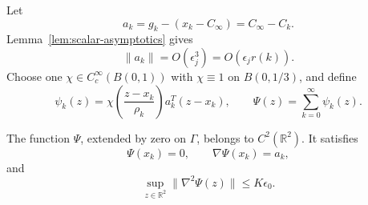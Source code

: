 \documentclass[smallextended,envcountsame]{svjour3}
\newcommand{\R}{\mathbb R}
\begin{document}
Let
\begin{equation}\label{eq:correction-vector}
a_k=g_k-(x_k-C_\infty)=C_\infty-C_k.
\end{equation}
Lemma~\ref{lem:scalar-asymptotics} gives
\begin{equation}\label{eq:ak-bound}
\|a_k\|=O(\epsilon_j^3)=O(\epsilon_jr(k)).
\end{equation}
Choose one $\chi\in C_c^\infty(B(0,1))$ with $\chi\equiv1$ on
$B(0,1/3)$, and define
\begin{equation}\label{eq:bumps}
\psi_k(z)=
\chi\!\left(\frac{z-x_k}{\rho_k}\right)a_k^T(z-x_k),
\qquad
\Psi(z)=\sum_{k=0}^\infty\psi_k(z).
\end{equation}

\begin{lemma}\label{lem:bump-extension}
The function $\Psi$, extended by zero on $\Gamma$, belongs to
$C^2(\R^2)$.  It satisfies
\begin{equation}\label{eq:bump-jets}
\Psi(x_k)=0,\qquad \nabla\Psi(x_k)=a_k,
\end{equation}
and
\begin{equation}\label{eq:bump-hessian}
\sup_{z\in\R^2}\|\nabla^2\Psi(z)\|
\le K\epsilon_0.
\end{equation}
\end{lemma}
\end{document}

